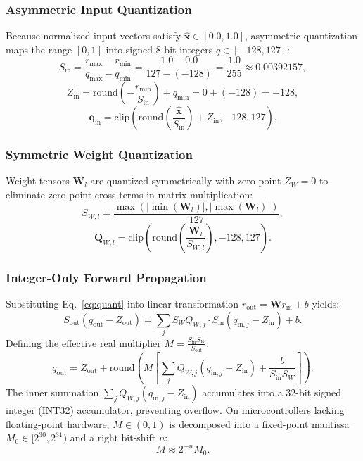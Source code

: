 \subsubsection{Asymmetric Input Quantization}
Because normalized input vectors satisfy $\hat{\mathbf{x}} \in [0.0, 1.0]$, asymmetric quantization maps the range $[0, 1]$ into signed 8-bit integers $q \in [-128, 127]$:
\begin{equation}
S_{\text{in}} = \frac{r_{\max} - r_{\min}}{q_{\max} - q_{\min}} = \frac{1.0 - 0.0}{127 - (-128)} = \frac{1.0}{255} \approx 0.00392157,
\end{equation}
\begin{equation}
Z_{\text{in}} = \text{round}\left(- \frac{r_{\min}}{S_{\text{in}}}\right) + q_{\min} = 0 + (-128) = -128,
\end{equation}
\begin{equation}
\mathbf{q}_{\text{in}} = \text{clip}\left(\text{round}\left(\frac{\hat{\mathbf{x}}}{S_{\text{in}}}\right) + Z_{\text{in}}, -128, 127\right).
\end{equation}

\subsubsection{Symmetric Weight Quantization}
Weight tensors $\mathbf{W}_l$ are quantized symmetrically with zero-point $Z_W = 0$ to eliminate zero-point cross-terms in matrix multiplication:
\begin{equation}
S_{W, l} = \frac{\max(|\min(\mathbf{W}_l)|, |\max(\mathbf{W}_l)|)}{127},
\end{equation}
\begin{equation}
\mathbf{Q}_{W, l} = \text{clip}\left(\text{round}\left(\frac{\mathbf{W}_l}{S_{W, l}}\right), -128, 127\right).
\end{equation}

\subsubsection{Integer-Only Forward Propagation}
Substituting Eq.~\eqref{eq:quant} into linear transformation $r_{\text{out}} = \mathbf{W} r_{\text{in}} + b$ yields:
\begin{equation}
S_{\text{out}}(q_{\text{out}} - Z_{\text{out}}) = \sum_{j} S_W Q_{W, j} \cdot S_{\text{in}} (q_{\text{in}, j} - Z_{\text{in}}) + b.
\end{equation}
Defining the effective real multiplier $M = \frac{S_{\text{in}} S_W}{S_{\text{out}}}$:
\begin{equation}
q_{\text{out}} = Z_{\text{out}} + \text{round}\left( M \left[ \sum_{j} Q_{W, j}(q_{\text{in}, j} - Z_{\text{in}}) + \frac{b}{S_{\text{in}} S_W} \right] \right).
\label{eq:int_eval}
\end{equation}
The inner summation $\sum_{j} Q_{W, j}(q_{\text{in}, j} - Z_{\text{in}})$ accumulates into a 32-bit signed integer ($\text{INT32}$) accumulator, preventing overflow. On microcontrollers lacking floating-point hardware, $M \in (0, 1)$ is decomposed into a fixed-point mantissa $M_0 \in [2^{30}, 2^{31})$ and a right bit-shift $n$:
\begin{equation}
M \approx 2^{-n} M_0.
\end{equation}

